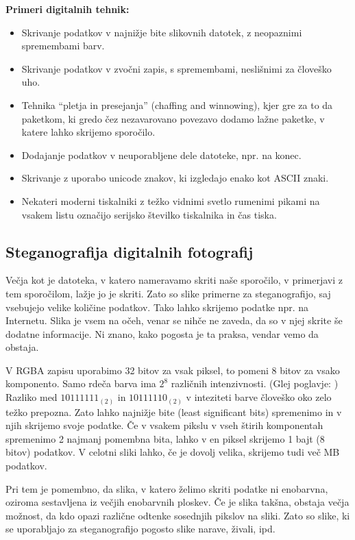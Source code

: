     \textbf{Primeri digitalnih tehnik:}
    \begin{itemize}
        \item Skrivanje podatkov v najnižje bite slikovnih datotek, z neopaznimi spremembami barv.
        \item Skrivanje podatkov v zvočni zapis, s spremembami, neslišnimi za človeško uho.
        \item Tehnika ``pletja in presejanja'' (chaffing and winnowing), kjer gre za to da paketkom, ki gredo čez nezavarovano povezavo dodamo lažne paketke, v katere lahko skrijemo sporočilo.
        \item Dodajanje podatkov v neuporabljene dele datoteke, npr. na konec.
        \item Skrivanje z uporabo unicode znakov, ki izgledajo enako kot ASCII znaki.
        \item Nekateri moderni tiskalniki z težko vidnimi svetlo rumenimi pikami na vsakem listu označijo serijsko številko tiskalnika in čas tiska.
        \cite{wikipedia}
    \end{itemize}

\subsection{Steganografija digitalnih fotografij}
    \label{steganografijaslik}
    Večja kot je datoteka, v katero nameravamo skriti naše sporočilo, v primerjavi z tem sporočilom, lažje jo je skriti. Zato so slike primerne za steganografijo, saj vsebujejo velike količine podatkov. Tako lahko skrijemo podatke npr. na Internetu. Slika je vsem na očeh, venar se nihče ne zaveda, da so v njej skrite še dodatne informacije. Ni znano, kako pogosta je ta praksa, vendar vemo da obstaja.
    
    V RGBA zapisu uporabimo 32 bitov za vsak piksel, to pomeni 8 bitov za vsako komponento. Samo rdeča barva ima $2^8$ različnih intenzivnosti. (Glej poglavje: ) Razliko med $10111111_{(2)}$ in $10111110_{(2)}$ v inteziteti barve človeško oko zelo težko prepozna. Zato lahko najnižje bite (least significant bits) spremenimo in v njih skrijemo svoje podatke. Če v vsakem pikslu v vseh štirih komponentah spremenimo 2 najmanj pomembna bita, lahko v en piksel skrijemo 1 bajt (8 bitov) podatkov. V celotni sliki lahko, če je dovolj velika, skrijemo tudi več MB podatkov.

    Pri tem je pomembno, da slika, v katero želimo skriti podatke ni enobarvna, oziroma sestavljena iz večjih enobarvnih ploskev. Če je slika takšna, obstaja večja možnost, da kdo opazi različne odtenke sosednjih pikslov na sliki. Zato so slike, ki se uporabljajo za steganografijo pogosto slike narave, živali, ipd.

